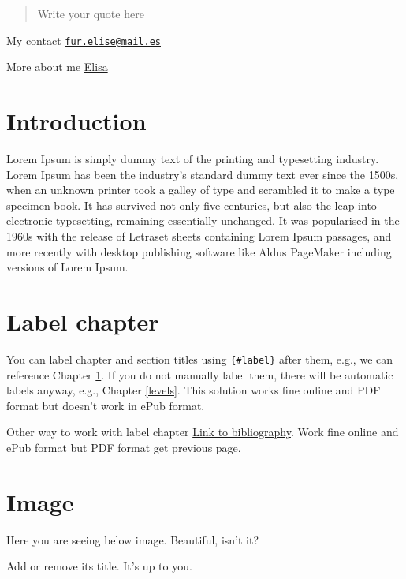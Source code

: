 \documentclass[
  english,
  a4paper,
  openany]{book}
\begin{document}
\begin{quote}
Write your quote here
\end{quote}

My contact \href{mailto:fur.elise@mail.es}{\nolinkurl{fur.elise@mail.es}}

More about me \href{https://about.me/}{Elisa}

\hypertarget{intro}{%
\chapter{Introduction}\label{intro}}

Lorem Ipsum is simply dummy text of the printing and typesetting industry. Lorem Ipsum has been the industry's standard dummy text ever since the 1500s, when an unknown printer took a galley of type and scrambled it to make a type specimen book. It has survived not only five centuries, but also the leap into electronic typesetting, remaining essentially unchanged. It was popularised in the 1960s with the release of Letraset sheets containing Lorem Ipsum passages, and more recently with desktop publishing software like Aldus PageMaker including versions of Lorem Ipsum.

\hypertarget{label-chapter}{%
\chapter{Label chapter}\label{label-chapter}}

You can label chapter and section titles using \texttt{\{\#label\}} after them, e.g., we can reference Chapter \ref{intro}. If you do not manually label them, there will be automatic labels anyway, e.g., Chapter \ref{levels}. This solution works fine online and PDF format but doesn't work in ePub format.

Other way to work with label chapter \protect\hyperlink{Link-to-bibliography}{Link to bibliography}. Work fine online and ePub format but PDF format get previous page.

\hypertarget{image}{%
\chapter{Image}\label{image}}

Here you are seeing below image. Beautiful, isn't it?

Add or remove its title. It's up to you.
\end{document}

